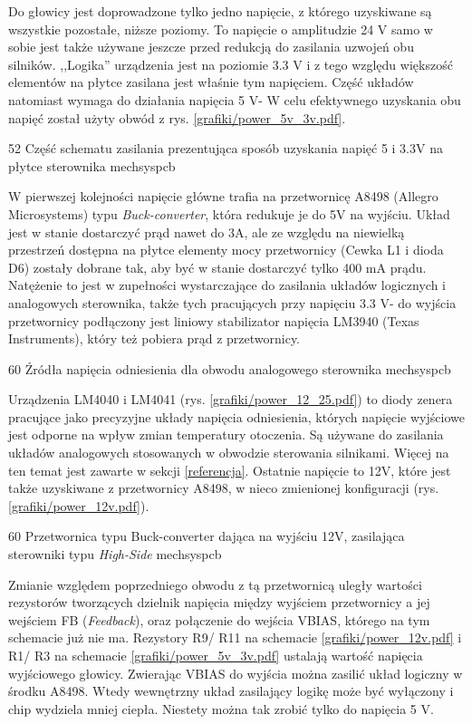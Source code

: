 Do głowicy jest doprowadzone tylko jedno napięcie, z którego uzyskiwane są wszystkie pozostałe, niższe poziomy. To napięcie o amplitudzie 24 V samo w sobie jest także używane jeszcze przed redukcją do zasilania uzwojeń obu silników. ,,Logika'' urządzenia jest na poziomie 3.3 V i z tego względu większość elementów na płytce zasilana jest właśnie tym napięciem. Część układów natomiast wymaga do działania napięcia 5 V- W celu efektywnego uzyskania obu napięć został użyty obwód z rys. \ref{grafiki/power_5v_3v.pdf}.

	{52}
	{Część schematu zasilania prezentująca sposób uzyskania napięć 5 i 3.3V na płytce sterownika}
	{mechsyspcb}

W pierwszej kolejności napięcie główne trafia na przetwornicę A8498 (Allegro Microsystems) typu {\it Buck-converter}, która redukuje je do 5V na wyjściu. Układ jest w stanie dostarczyć prąd nawet do 3A, ale ze względu na niewielką przestrzeń dostępna na płytce elementy mocy przetwornicy (Cewka L1 i dioda D6) zostały dobrane tak, aby być w stanie dostarczyć tylko 400 mA prądu. Natężenie to jest w zupełności wystarczające do zasilania układów logicznych i analogowych sterownika, także tych pracujących przy napięciu 3.3 V- do wyjścia przetwornicy podłączony jest liniowy stabilizator napięcia LM3940 (Texas Instruments), który też pobiera prąd z przetwornicy.

	{60}
	{Źródła napięcia odniesienia dla obwodu analogowego sterownika}
	{mechsyspcb}
	
Urządzenia LM4040 i LM4041 (rys. \ref{grafiki/power_12_25.pdf}) to diody zenera pracujące jako precyzyjne układy napięcia odniesienia, których napięcie wyjściowe jest odporne na wpływ zmian temperatury otoczenia. Są używane do zasilania układów analogowych stosowanych w obwodzie sterowania silnikami. Więcej na ten temat jest zawarte w sekcji \ref{referencja}. Ostatnie napięcie to 12V, które jest także uzyskiwane z przetwornicy A8498, w nieco zmienionej konfiguracji (rys. \ref{grafiki/power_12v.pdf}).

	{60}
	{Przetwornica typu Buck-converter dająca na wyjściu 12V, zasilająca sterowniki typu {\it High-Side}}
	{mechsyspcb}

Zmianie względem poprzedniego obwodu z tą przetwornicą uległy wartości rezystorów tworzących dzielnik napięcia między wyjściem przetwornicy a jej wejściem FB ({\it Feedback}), oraz połączenie do wejścia VBIAS, którego na tym schemacie już nie ma. Rezystory R9/ R11 na schemacie \ref{grafiki/power_12v.pdf} i R1/ R3 na schemacie \ref{grafiki/power_5v_3v.pdf} ustalają wartość napięcia wyjściowego głowicy. Zwierając VBIAS do wyjścia można zasilić układ logiczny w środku A8498. Wtedy wewnętrzny układ zasilający logikę może być wyłączony i chip wydziela mniej ciepła. Niestety można tak zrobić tylko do napięcia 5 V. \\

